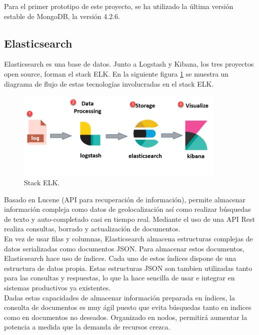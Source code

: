 \documentclass[a4paper, 12pt]{book}
\begin{document}
		Para el primer prototipo de este proyecto, se ha utilizado la última versión estable de MongoDB, la versión 4.2.6.
		
	\subsection{Elasticsearch}
	\label{subsec:elasticsearch}
		Elasticsearch \cite{elasticsearch} es una base de datos. Junto a Logstash y Kibana, los tres proyectos open source, forman el stack ELK. En la siguiente figura \ref{fig:ELK_Stack} se muestra un diagrama de flujo de estas tecnologías involucradas en el stack ELK.\\
		
		\begin{figure}[H]
			\centering
			\includegraphics[width=10cm, keepaspectratio]{img/ELK_Stack.png}
			\caption{Stack ELK.}
			\label{fig:ELK_Stack}
		\end{figure}
		
		Basado en Lucene (API para recuperación de información), permite almacenar información compleja como datos de geolocalización así como realizar búsquedas de texto y auto-completado casi en tiempo real. Mediante el uso de una API Rest realiza consultas, borrado y actualización de documentos.\\
		
		En vez de usar filas y columnas, Elasticsearch almacena estructuras complejas de datos serializadas como documentos JSON. Para almacenar estos documentos, Elasticsearch hace uso de índices. Cada uno de estos índices dispone de una estructura de datos propia. Estas estructuras JSON son tambien utilizadas tanto para las consultas y respuestas, lo que la hace sencilla de usar e integrar en sistemas productivos ya existentes.\\
		
		Dadas estas capacidades de almacenar información preparada en índices, la consulta de documentos es muy ágil puesto que evita búsquedas tanto en indices como en documentos no deseados. Organizado en nodos, permitirá aumentar la potencia a medida que la demanda de recursos crezca. \\
		
\end{document}
